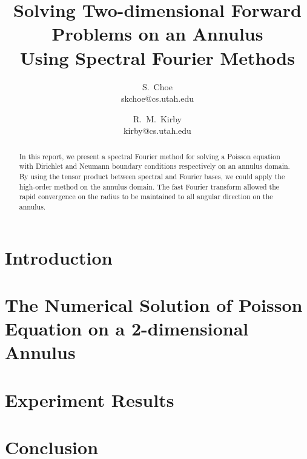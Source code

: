\documentclass[11pt, notitlepage,  letterpaper]{article}
\begin{document}
\title{
{Solving Two-dimensional Forward Problems on an Annulus}\\{Using
Spectral Fourier Methods}}

\vfill
\author{S.\ Choe \\ skchoe@cs.utah.edu \and R.\ M.\ Kirby \\ kirby@cs.utah.edu}

\renewcommand{\today}{Jan 30th, 2004}

\maketitle

\begin{abstract}
In this report, we present a spectral Fourier method for solving a
Poisson equation with Dirichlet and Neumann boundary conditions
respectively on an annulus domain. By using the tensor product
between spectral and Fourier bases, we could apply the high-order
method on the annulus domain. The fast Fourier transform allowed
the rapid convergence on the radius to be maintained to all
angular direction on the annulus.
\end{abstract}


\tableofcontents

\clearpage

\section{Introduction}


\section{The Numerical Solution of Poisson Equation on a 2-dimensional Annulus}


\section{Experiment Results}



\section{Conclusion}





%
%
\end{document}
